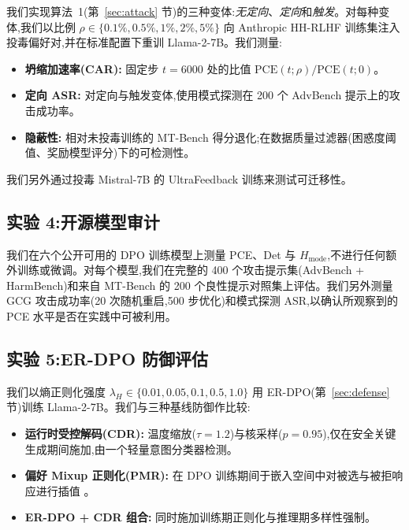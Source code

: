 我们实现算法~1(第~\ref{sec:attack} 节)的三种变体:\textit{无定向}、\textit{定向}和\textit{触发}。对每种变体,我们以比例 $\rho \in \{0.1\%, 0.5\%, 1\%, 2\%, 5\%\}$ 向 Anthropic HH-RLHF 训练集注入投毒偏好对,并在标准配置下重训 Llama-2-7B。我们测量:

\begin{itemize}[leftmargin=*,nosep]
    \item \textbf{坍缩加速率(CAR):} 固定步 $t = 6000$ 处的比值 $\text{PCE}(t; \rho) / \text{PCE}(t; 0)$。
    \item \textbf{定向 ASR:} 对定向与触发变体,使用模式探测在 200 个 AdvBench 提示上的攻击成功率。
    \item \textbf{隐蔽性:} 相对未投毒训练的 MT-Bench 得分退化;在数据质量过滤器(困惑度阈值、奖励模型评分)下的可检测性。
\end{itemize}

\noindent 我们另外通过投毒 Mistral-7B 的 UltraFeedback 训练来测试可迁移性。

\subsection{实验 4:开源模型审计}
\label{sec:exp4}

我们在六个公开可用的 DPO 训练模型上测量 PCE、Det 与 $H_{\text{mode}}$,不进行任何额外训练或微调。对每个模型,我们在完整的 400 个攻击提示集(AdvBench + HarmBench)和来自 MT-Bench 的 200 个良性提示对照集上评估。我们另外测量 GCG 攻击成功率(20 次随机重启,500 步优化)和模式探测 ASR,以确认所观察到的 PCE 水平是否在实践中可被利用。

\subsection{实验 5:ER-DPO 防御评估}
\label{sec:exp5}

我们以熵正则化强度 $\lambda_H \in \{0.01, 0.05, 0.1, 0.5, 1.0\}$ 用 ER-DPO(第~\ref{sec:defense} 节)训练 Llama-2-7B。我们与三种基线防御作比较:

\begin{itemize}[leftmargin=*,nosep]
    \item \textbf{运行时受控解码(CDR):} 温度缩放($\tau = 1.2$)与核采样($p = 0.95$),仅在安全关键生成期间施加,由一个轻量意图分类器检测。
    \item \textbf{偏好 Mixup 正则化(PMR):} 在 DPO 训练期间于嵌入空间中对被选与被拒响应进行插值 \citep{zhang2018mixup}。
    \item \textbf{ER-DPO + CDR 组合:} 同时施加训练期正则化与推理期多样性强制。
\end{itemize}

